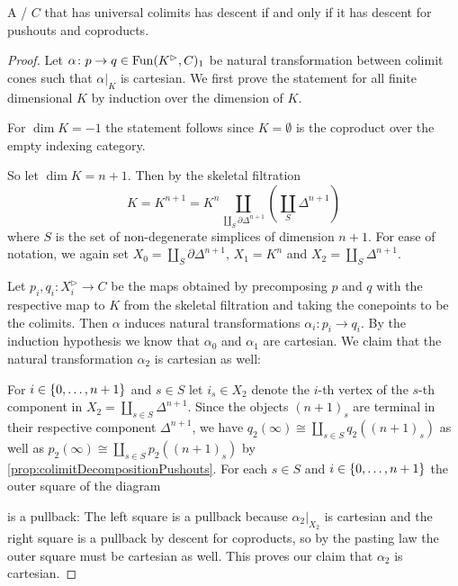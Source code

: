 \begin{lemma}\label{lem:descentIffDescentPoAndCoprod}
    A \inftycat/ $C$ that has universal colimits has descent if and only if it has descent for pushouts and coproducts.
    \begin{proof}
        Let $\alpha\colon p\to q\in\operatorname{Fun}(K^{\rhd},C)_1$ be natural transformation between colimit cones such that $\alpha|_K$ is cartesian.
        We first prove the statement for all finite dimensional $K$ by induction over the dimension of $K$.

        For $\dim K=-1$ the statement follows since $K=\emptyset$ is the coproduct over the empty indexing category.

        So let $\dim K=n+1$.
        Then by the skeletal filtration
        \begin{equation*}
            K=K^{n+1}=K^n\coprod\limits_{\coprod\limits_S \partial\Delta^{n+1}}\left(\coprod_S \Delta^{n+1}\right)
        \end{equation*}
        where $S$ is the set of non-degenerate simplices of dimension $n+1$.
        For ease of notation, we again set $X_{0}=\coprod\limits_S \partial\Delta^{n+1}$, $X_1=K^n$ and $X_2=\coprod\limits_S \Delta^{n+1}$.
        
        Let $p_i,q_i\colon X_i^{\rhd}\to C$ be the maps obtained by precomposing $p$ and $q$ with the respective map to $K$ from the skeletal filtration and taking the conepoints to be the colimits.
        Then $\alpha$ induces natural transformations $\alpha_i\colon p_i\to q_i$.
        By the induction hypothesis we know that $\alpha_0$ and $\alpha_1$ are cartesian.
        We claim that the natural transformation $\alpha_2$ is cartesian as well: 

        For $i\in\left\lbrace0,\ldots,n+1\right\rbrace$ and $s\in S$ let $i_s\in X_2$ denote the $i$-th vertex of the $s$-th component in $X_2=\coprod\limits_{s\in S} \Delta^{n+1}$.
        Since the objects $(n+1)_s$ are terminal in their respective component $\Delta^{n+1}$, we have $q_2(\infty)\cong\coprod\limits_{s\in S} q_2((n+1)_s)$ as well as $p_2(\infty)\cong\coprod\limits_{s\in S} p_2((n+1)_s)$ by \cref{prop:colimitDecompositionPushouts}.
        For each $s\in S$ and $i\in\left\lbrace0,\ldots,n+1\right\rbrace$ the outer square of the diagram
        \begin{center}
        \end{center}
        is a pullback: The left square is a pullback because $\alpha_2|_{X_2}$ is cartesian and the right square is a pullback by descent for coproducts, so by the pasting law the outer square must be cartesian as well.
        This proves our claim that $\alpha_2$ is cartesian.


\end{proof}
\end{lemma}
